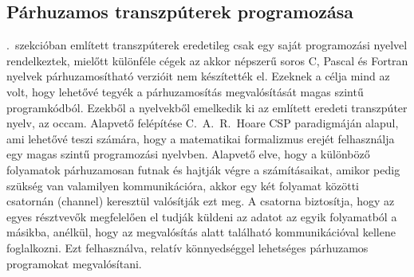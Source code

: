 %
%
%
%

\subsection{Párhuzamos transzpúterek programozása}

.~szekcióban említett transzpúterek eredetileg csak egy saját programozási nyelvel rendelkeztek, mielőtt különféle cégek az akkor népszerű soros C, Pascal és Fortran nyelvek párhuzamosítható verzióit nem készítették el.
Ezeknek a célja mind az volt, hogy lehetővé tegyék a párhuzamosítás megvalósítását magas szintű programkódból.
Ezekből a nyelvekből emelkedik ki az említett eredeti transzpúter nyelv, az occam.
Alapvető felépítése C.~A.~R.~Hoare CSP paradigmáján \cite{hoare_communicating_2004} alapul, ami lehetővé teszi számára, hogy a matematikai formalizmus erejét felhasználja egy magas szintű programozási nyelvben.
Alapvető elve, hogy a különböző folyamatok párhuzamosan futnak és hajtják végre a számításaikat, amikor pedig szükség van valamilyen kommunikációra, akkor egy két folyamat közötti csatornán (channel) keresztül valósítják ezt meg.
A csatorna biztosítja, hogy az egyes résztvevők megfelelően el tudják küldeni az adatot az egyik folyamatból a másikba, anélkül, hogy az megvalósítás alatt található kommunikációval kellene foglalkozni. 
Ezt felhasználva, relatív könnyedséggel lehetséges párhuzamos programokat megvalósítani.

